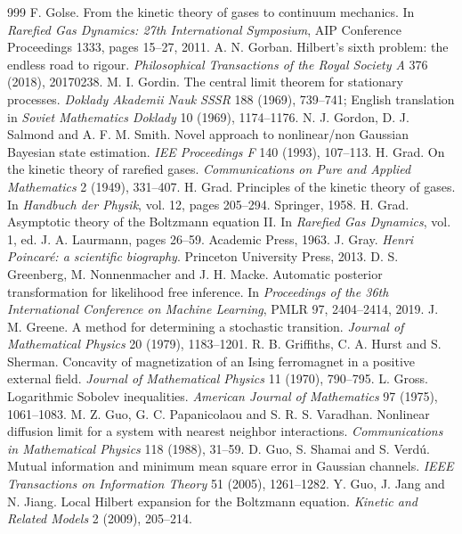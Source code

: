 \begin{thebibliography}{999}
 F. Golse. From the kinetic theory of gases to continuum mechanics. In \emph{Rarefied Gas Dynamics: 27th International Symposium}, AIP Conference Proceedings 1333, pages 15--27, 2011.
 A. N. Gorban. Hilbert's sixth problem: the endless road to rigour. \emph{Philosophical Transactions of the Royal Society A} 376 (2018), 20170238.
 M. I. Gordin. The central limit theorem for stationary processes. \emph{Doklady Akademii Nauk SSSR} 188 (1969), 739--741; English translation in \emph{Soviet Mathematics Doklady} 10 (1969), 1174--1176.
 N. J. Gordon, D. J. Salmond and A. F. M. Smith. Novel approach to nonlinear/non Gaussian Bayesian state estimation. \emph{IEE Proceedings F} 140 (1993), 107--113.
 H. Grad. On the kinetic theory of rarefied gases. \emph{Communications on Pure and Applied Mathematics} 2 (1949), 331--407.
 H. Grad. Principles of the kinetic theory of gases. In \emph{Handbuch der Physik}, vol. 12, pages 205--294. Springer, 1958.
 H. Grad. Asymptotic theory of the Boltzmann equation II. In \emph{Rarefied Gas Dynamics}, vol. 1, ed. J. A. Laurmann, pages 26--59. Academic Press, 1963.
 J. Gray. \emph{Henri Poincar\'e: a scientific biography}. Princeton University Press, 2013.
 D. S. Greenberg, M. Nonnenmacher and J. H. Macke. Automatic posterior transformation for likelihood free inference. In \emph{Proceedings of the 36th International Conference on Machine Learning}, PMLR 97, 2404--2414, 2019.
 J. M. Greene. A method for determining a stochastic transition. \emph{Journal of Mathematical Physics} 20 (1979), 1183--1201.
 R. B. Griffiths, C. A. Hurst and S. Sherman. Concavity of magnetization of an Ising ferromagnet in a positive external field. \emph{Journal of Mathematical Physics} 11 (1970), 790--795.
 L. Gross. Logarithmic Sobolev inequalities. \emph{American Journal of Mathematics} 97 (1975), 1061--1083.
 M. Z. Guo, G. C. Papanicolaou and S. R. S. Varadhan. Nonlinear diffusion limit for a system with nearest neighbor interactions. \emph{Communications in Mathematical Physics} 118 (1988), 31--59.
 D. Guo, S. Shamai and S. Verd\'u. Mutual information and minimum mean square error in Gaussian channels. \emph{IEEE Transactions on Information Theory} 51 (2005), 1261--1282.
 Y. Guo, J. Jang and N. Jiang. Local Hilbert expansion for the Boltzmann equation. \emph{Kinetic and Related Models} 2 (2009), 205--214.

\end{thebibliography}
